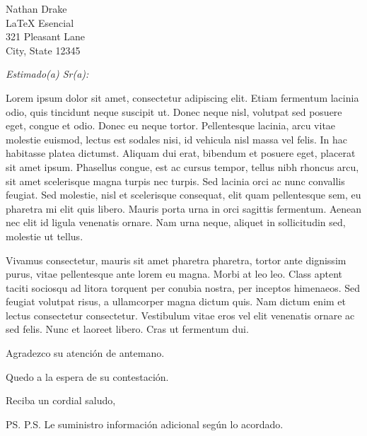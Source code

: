 \documentclass[10pt,a4paper]{letter}
\begin{document}
\begin{letter}{Nathan Drake \\ LaTeX Esencial \\ 321 Pleasant Lane \\ City, State 12345}


\opening{\emph{Estimado(a) Sr(a):}}

Lorem ipsum dolor sit amet, consectetur adipiscing elit. Etiam fermentum lacinia odio, quis tincidunt neque suscipit ut. Donec neque nisl, volutpat sed posuere eget, congue et odio. Donec eu neque tortor. Pellentesque lacinia, arcu vitae molestie euismod, lectus est sodales nisi, id vehicula nisl massa vel felis. In hac habitasse platea dictumst. Aliquam dui erat, bibendum et posuere eget, placerat sit amet ipsum. Phasellus congue, est ac cursus tempor, tellus nibh rhoncus arcu, sit amet scelerisque magna turpis nec turpis. Sed lacinia orci ac nunc convallis feugiat. Sed molestie, nisl et scelerisque consequat, elit quam pellentesque sem, eu pharetra mi elit quis libero. Mauris porta urna in orci sagittis fermentum. Aenean nec elit id ligula venenatis ornare. Nam urna neque, aliquet in sollicitudin sed, molestie ut tellus.

Vivamus consectetur, mauris sit amet pharetra pharetra, tortor ante dignissim purus, vitae pellentesque ante lorem eu magna. Morbi at leo leo. Class aptent taciti sociosqu ad litora torquent per conubia nostra, per inceptos himenaeos. Sed feugiat volutpat risus, a ullamcorper magna dictum quis. Nam dictum enim et lectus consectetur consectetur. Vestibulum vitae eros vel elit venenatis ornare ac sed felis. Nunc et laoreet libero. Cras ut fermentum dui.

Agradezco su atención de antemano.

Quedo a la espera de su contestación.

\vspace{2\parskip}
\closing{Reciba un cordial saludo,}
\vspace{2\parskip}

\ps{P.S. Le suministro información adicional según lo acordado.}

\end{letter}
 
\end{document}
